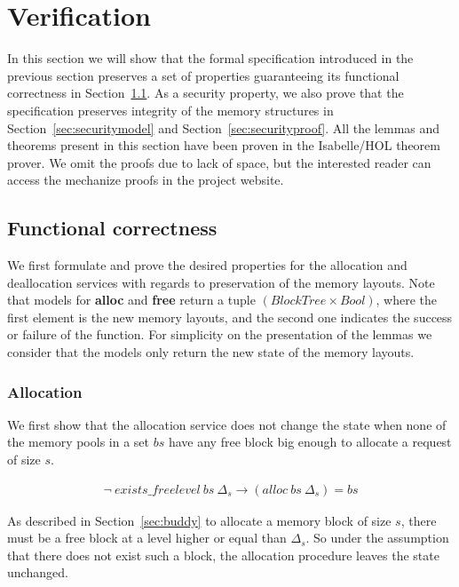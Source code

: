 \section{Verification}
In this section we will show that the formal specification introduced in the previous section preserves a set of properties guaranteeing its functional correctness in Section~\ref{sec:functional}. As a security property, we also prove that the specification preserves integrity of the memory structures in Section~\ref{sec:securitymodel} and Section~\ref{sec:securityproof}. All the lemmas and theorems present in this section have been proven in the Isabelle/HOL theorem prover. We omit the proofs due to lack of space, but the interested reader can access the mechanize proofs in the project website.

\subsection{Functional correctness}\label{sec:functional}
We first formulate and prove the desired properties for the allocation and deallocation services with regards to preservation of the memory layouts. Note that models for \textbf{alloc} and \textbf{free} return a tuple $(BlockTree \times Bool)$, where the first element is the new memory layouts, and the second one indicates the success or failure of the function. For simplicity on the presentation of the lemmas we consider that the models only return the new state of the memory layouts.

\subsubsection{Allocation}\label{sec:functionalalloc}
We first show that the allocation service does not change the state when none of the memory pools in a set $bs$ have any free block big enough to allocate a request of size $s$. 

\begin{lemma} 
\label{lemma:no_free_space}
\begin{align*}
\neg\ exists\_freelevel\ bs\ \Delta_s \longrightarrow (alloc\ bs\ \Delta_s) = bs
\end{align*}
\end{lemma}

As described in Section~\ref{sec:buddy} to allocate a memory block of size $s$, there must be a free block at a level higher or equal than $\Delta_s$. So under the assumption that there does not exist such a block, the allocation procedure leaves the state unchanged.

